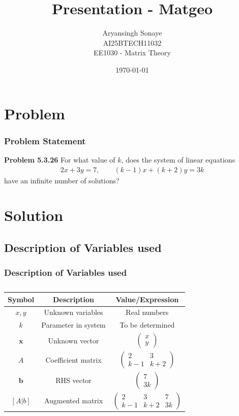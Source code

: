 \documentclass{beamer}
\title{Presentation - Matgeo}
\author{Aryansingh Sonaye \\
AI25BTECH11032 \\
EE1030 - Matrix Theory}
\date{\today}
\theoremstyle{remark}
\newcommand{\myvec}[1]{\ensuremath{\begin{pmatrix}#1\end{pmatrix}}}
\let\vec\mathbf
\numberwithin{equation}{section}
\begin{document}
\begin{frame}
\titlepage
\end{frame}

\section{Problem}
\begin{frame}
\frametitle{Problem Statement}
\textbf{Problem 5.3.26}
For what value of $k$, does the system of linear equations
\begin{align}
2x + 3y = 7, \qquad (k-1)x + (k+2)y = 3k
\end{align}
have an infinite number of solutions?

\end{frame}

\section{Solution}
\subsection{Description of Variables used}
\begin{frame}
\frametitle{Description of Variables used}
\begin{table}[H]
\centering
\begin{tabular}{|c|c|c|}
\hline
\textbf{Symbol} & \textbf{Description} & \textbf{Value/Expression} \\
\hline
$x,y$ & Unknown variables & Real numbers \\
$k$ & Parameter in system & To be determined \\
$\vec{x}$ & Unknown vector & $\myvec{x \\ y}$ \\
$A$ & Coefficient matrix & $\myvec{2 & 3 \\ k-1 & k+2}$ \\
$\vec{b}$ & RHS vector & $\myvec{7 \\ 3k}$ \\
$[A|b]$ & Augmented matrix & $\myvec{2 & 3 & 7 \\ k-1 & k+2 & 3k}$ \\
\hline
\end{tabular}
\caption{}
\label{}
\end{table}


\end{frame}
\end{document}
